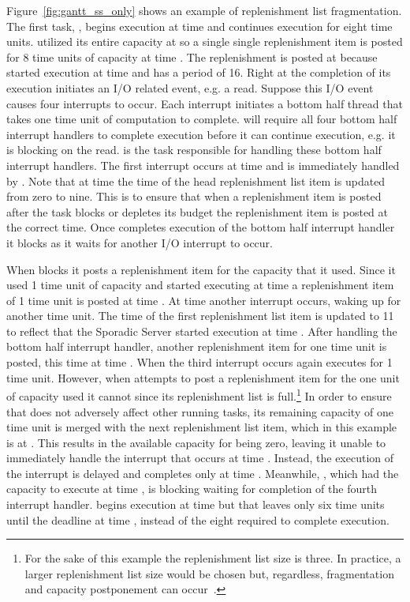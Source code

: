 Figure~\ref{fig:gantt_ss_only} shows an example of replenishment list
fragmentation.  The first task, , begins execution at time  and
continues execution for eight time units.   utilized its entire
capacity at  so a single single replenishment item is posted for 8 time
units of capacity at time .  The replenishment is posted at 
because  started execution at time  and has a period of 16.
Right at the completion of its execution  initiates an I/O related
event, e.g. a read.  Suppose this I/O event causes four interrupts to
occur.  Each interrupt initiates a bottom half thread that takes one time unit
of computation to complete.   will require all four bottom half
interrupt handlers to complete execution before it can continue execution,
e.g. it is blocking on the read.   is the task responsible for
handling these bottom half interrupt handlers.  The first interrupt occurs at
time  and is immediately handled by .  Note that at time
 the time of the head replenishment list item is updated from zero to
nine.  This is to ensure that when a replenishment item is posted after the
task blocks or depletes its budget the replenishment item is posted at the
correct time.  Once  completes execution of the bottom half interrupt
handler it blocks as it waits for another I/O interrupt to occur.

When  blocks it posts a replenishment item for the capacity that it
used.  Since it used 1 time unit of capacity and started executing at time
 a replenishment item of 1 time unit is posted at time .  At
time  another interrupt occurs, waking up  for another time
unit.  The time of the first replenishment list item is updated to 11 to
reflect that the Sporadic Server started execution at time .  After
handling the bottom half interrupt handler, another replenishment item for one
time unit is posted, this time at time .  When the third interrupt
occurs  again executes for 1 time unit.  However, when 
attempts to post a replenishment item for the one unit of capacity used it
cannot since its replenishment list is full.\footnote{For the sake of this
example the replenishment list size is three.  In practice, a larger
replenishment list size would be chosen but, regardless, fragmentation and
capacity postponement can occur~\cite{DanishLiWe11}.}  In order to ensure that
 does not adversely affect other running tasks, its remaining capacity
of one time unit is merged with the next replenishment list item, which in
this example is at .  This results in the available capacity for
 being zero, leaving it unable to immediately handle the interrupt
that occurs at time .  Instead, the execution of the interrupt is
delayed and completes only at time .  Meanwhile, , which had
the capacity to execute at time , is blocking waiting for completion of
the fourth interrupt handler.   begins execution at time  but
that leaves only six time units until the deadline at time , instead
of the eight required to complete execution.

